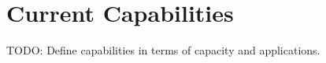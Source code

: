 \section{Current Capabilities}

TODO: Define capabilities in terms of capacity and applications.

%






